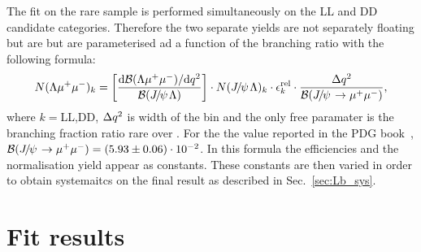 The fit on the rare sample is performed simultaneously on the LL and DD candidate categories.
Therefore the two separate yields are not separately floating but are but are parameterised
ad a function of the branching ratio with the following formula:
%
\begin{equation}
N(\Lz\mumu)_{k}  = \left[ \frac{\mathrm{d}\mathcal{B}(\Lz\mumu)/\mathrm{d}\qsq}{\mathcal{B}(\jpsi\Lz)} \right]  \cdot
N(\jpsi\Lz)_{k} \cdot \epsilon^{\mathrm{rel}}_{k} \cdot \frac {\Delta\qsq} { \mathcal{B}(\jpsi\to\mumu) },
\label{eq:relYield}
\end{equation}
%
where $k = $LL,DD, $\Delta q^2$ is width of the \qsq bin and the only free paramater is the branching 
fraction ratio rare over \jpsi. For the \jpsi\to\mumu the value reported in the PDG book~\cite{PDG2014}, 
$\mathcal{B}(\jpsi\to\mumu) = (5.93 \pm 0.06)\cdot 10^{-2}$. In this formula the efficiencies and the normalisation 
yield appear as constants. These constants are then varied in order to obtain systemaitcs on the final result 
as described in Sec.~\ref{sec:Lb_sys}.


\section{Fit results}



